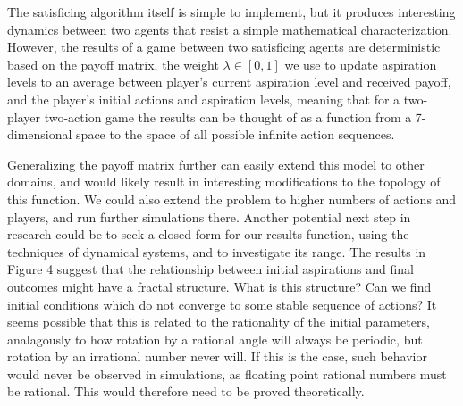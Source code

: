 \documentclass[11pt]{article}
\begin{document}
The satisficing algorithm itself is simple to implement, but it produces interesting dynamics between two agents that resist a simple mathematical characterization. However, the results of a game between two satisficing agents are deterministic based on the payoff matrix, the weight $\lambda\in [0,1]$ we use to update aspiration levels to an average between player's current aspiration level and received payoff, and the player's initial actions and aspiration levels, meaning that for a two-player two-action game the results can be thought of as a function from a 7-dimensional space to the space of all possible infinite action sequences.

Generalizing the payoff matrix further can easily extend this model to other domains, and would likely result in interesting modifications to the topology of this function. We could also extend the problem to higher numbers of actions and players, and run further simulations there. Another potential next step in research could be to seek a closed form for our results function, using the techniques of dynamical systems, and to investigate its range. The results in Figure 4 suggest that the relationship between initial aspirations and final outcomes might have a fractal structure. What is this structure? Can we find initial conditions which do not converge to some stable sequence of actions? It seems possible that this is related to the rationality of the initial parameters, analagously to how rotation by a rational angle will always be periodic, but rotation by an irrational number never will. If this is the case, such behavior would never be observed in simulations, as floating point rational numbers must be rational. This would therefore need to be proved theoretically.
\end{document}
